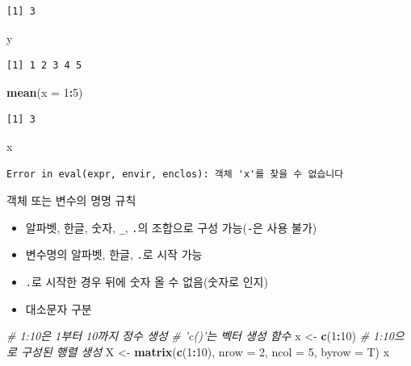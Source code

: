 \documentclass[
  11pt,
]{krantz}
\newenvironment{Shaded}{\begin{snugshade}}{\end{snugshade}}
\newcommand{\CommentTok}[1]{\textcolor[rgb]{0.37,0.37,0.37}{\textit{#1}}}
\newcommand{\DataTypeTok}[1]{\textcolor[rgb]{0.27,0.27,0.27}{#1}}
\newcommand{\DecValTok}[1]{\textcolor[rgb]{0.06,0.06,0.06}{#1}}
\newcommand{\KeywordTok}[1]{\textcolor[rgb]{0.27,0.27,0.27}{\textbf{#1}}}
\newcommand{\NormalTok}[1]{#1}
\newcommand{\OperatorTok}[1]{\textcolor[rgb]{0.43,0.43,0.43}{\textbf{#1}}}
\newcommand{\StringTok}[1]{\textcolor[rgb]{0.5,0.5,0.5}{#1}}
\providecommand{\tightlist}{%
  \setlength{\itemsep}{0pt}\setlength{\parskip}{0pt}}
\begin{document}
\begin{verbatim}
[1] 3
\end{verbatim}

\begin{Shaded}
\begin{Highlighting}[]
\NormalTok{y}
\end{Highlighting}
\end{Shaded}

\begin{verbatim}
[1] 1 2 3 4 5
\end{verbatim}

\begin{Shaded}
\begin{Highlighting}[]
\KeywordTok{mean}\NormalTok{(}\DataTypeTok{x =} \DecValTok{1}\OperatorTok{:}\DecValTok{5}\NormalTok{)}
\end{Highlighting}
\end{Shaded}

\begin{verbatim}
[1] 3
\end{verbatim}

\begin{Shaded}
\begin{Highlighting}[]
\NormalTok{x}
\end{Highlighting}
\end{Shaded}

\begin{verbatim}
Error in eval(expr, envir, enclos): 객체 'x'를 찾을 수 없습니다
\end{verbatim}

\normalsize

객체 또는 변수의 명명 규칙

\begin{itemize}
\tightlist
\item
  알파벳, 한글, 숫자, \texttt{\_}, \texttt{.}의 조합으로 구성 가능(\texttt{-}은 사용 불가)
\item
  변수명의 알파벳, 한글, \texttt{.}로 시작 가능
\item
  \texttt{.}로 시작한 경우 뒤에 숫자 올 수 없음(숫자로 인지)
\item
  대소문자 구분
\end{itemize}

\footnotesize

\begin{Shaded}
\begin{Highlighting}[]
\CommentTok{# 1:10은 1부터 10까지 정수 생성}
\CommentTok{# 'c()'는 벡터 생성 함수}
\NormalTok{x <-}\StringTok{ }\KeywordTok{c}\NormalTok{(}\DecValTok{1}\OperatorTok{:}\DecValTok{10}\NormalTok{) }
\CommentTok{# 1:10으로 구성된 행렬 생성}
\NormalTok{X <-}\StringTok{ }\KeywordTok{matrix}\NormalTok{(}\KeywordTok{c}\NormalTok{(}\DecValTok{1}\OperatorTok{:}\DecValTok{10}\NormalTok{), }\DataTypeTok{nrow =} \DecValTok{2}\NormalTok{, }\DataTypeTok{ncol =} \DecValTok{5}\NormalTok{, }\DataTypeTok{byrow =}\NormalTok{ T)}
\NormalTok{x}
\end{Highlighting}
\end{Shaded}
\end{document}
